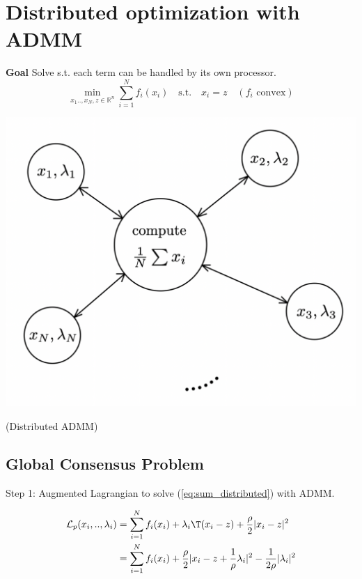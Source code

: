 
\section{Distributed optimization with ADMM}

\textbf{Goal}
Solve s.t. each term can be handled by its own processor.
\vspace{-2mm}
\begin{equation}
	\min_{x_1..,x_N, z \in \mathbb{R}^{n}}
	\sum_{i = 1}^{N} f_i(x_i)
	\quad\text{s.t.}\quad x_i=z
	\quad(f_i \text{ convex})
	\label{eq:sum_distributed}
\end{equation}

\begin{center}
	\includegraphics[width=0.92\columnwidth]{images/distributed.png}

	(Distributed ADMM)
\end{center}
\subsection{Global Consensus Problem}

Step 1: Augmented Lagrangian%
\vspace{-2mm}
to solve (\ref{eq:sum_distributed}) with ADMM.

$$\begin{aligned}
		\mathcal{L}_p(x_i,..,\lambda_i) & =
		\sum_{i=1}^{N}f_i(x_i)
		+\lambda_i\T(x_i-z)+\frac{\rho}{2}|x_i-z|^2
		\\
		                                & =\sum_{i=1}^{N}f_i(x_i)
		+\frac{\rho}{2}|x_i-z+\frac{1}{\rho}\lambda_i|^2-\frac{1}{2\rho}|\lambda_i|^2
	\end{aligned}$$

